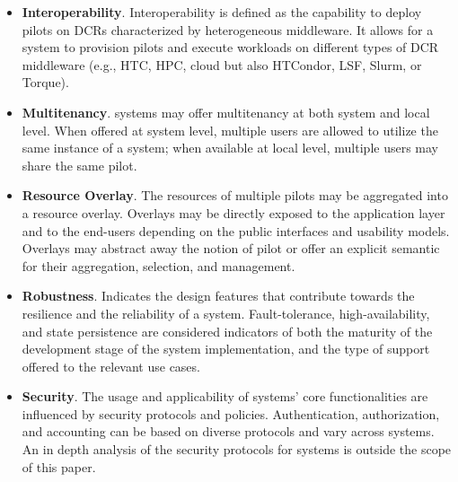 \documentclass{sig-alternate}
\begin{document}
\begin{itemize}
\item \textbf{Interoperability}. Interoperability is defined as the capability
  to deploy pilots on DCRs characterized by heterogeneous middleware. It allows
  for a \pilot system to provision pilots and execute workloads on different
  types of DCR middleware (e.g., HTC, HPC, cloud but also HTCondor, LSF, Slurm,
  or Torque).

\item \textbf{Multitenancy}. \pilot systems may offer multitenancy at both
  system and local level. When offered at system level, multiple users are
  allowed to utilize the same instance of a \pilot system; when available at
  local level, multiple users may share the same pilot.

\item \textbf{Resource Overlay}. The resources of multiple pilots may be
  aggregated into a resource overlay. Overlays may be directly exposed to the
  application layer and to the end-users depending on the public interfaces and
  usability models. Overlays may abstract away the notion of pilot or offer an
  explicit semantic for their aggregation, selection, and management.

\item \textbf{Robustness}. Indicates the design features that contribute towards
  the resilience and the reliability of a \pilot system. Fault-tolerance,
  high-availability, and state persistence are considered indicators of both the
  maturity of the development stage of the \pilot system implementation, and the
  type of support offered to the relevant use cases.


\item \textbf{Security}. The usage and applicability of \pilot systems' core
  functionalities are influenced by security protocols and policies.
  Authentication, authorization, and accounting can be based on diverse
  protocols and vary across \pilot systems. An in depth analysis of the security
  protocols for \pilot systems is outside the scope of this paper.


\end{itemize}
\end{document}
